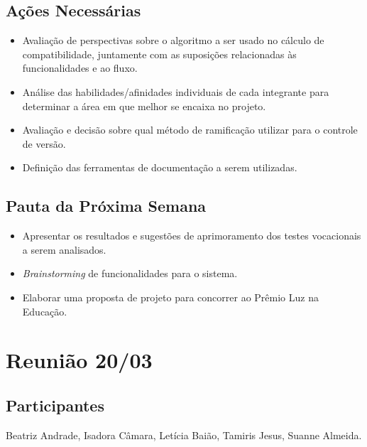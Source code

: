 \begin{apendicesenv}
\subsection*{Ações Necessárias}
\begin{itemize}
    \item Avaliação de perspectivas sobre o algoritmo a ser usado no cálculo de compatibilidade, juntamente com as suposições relacionadas às funcionalidades e ao fluxo.
    \item Análise das habilidades/afinidades individuais de cada integrante para determinar a área em que melhor se encaixa no projeto.
    \item Avaliação e decisão sobre qual método de ramificação utilizar para o controle de versão.
    \item Definição das ferramentas de documentação a serem utilizadas.
\end{itemize}

\subsection*{Pauta da Próxima Semana}
\begin{itemize}
    \item Apresentar os resultados e sugestões de aprimoramento dos testes vocacionais a serem analisados.
    \item \textit{Brainstorming} de funcionalidades para o sistema.
    \item Elaborar uma proposta de projeto para concorrer ao Prêmio Luz na Educação.
\end{itemize}

\section*{Reunião 20/03}

\subsection*{Participantes}
Beatriz Andrade, Isadora Câmara, Letícia Baião, Tamiris Jesus, Suanne Almeida.


\end{apendicesenv}
